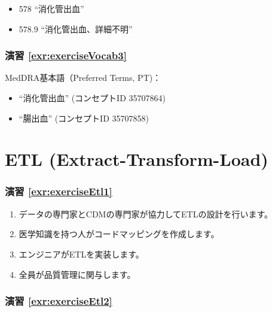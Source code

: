 \documentclass[
  11pt]{book}
\providecommand{\tightlist}{%
  \setlength{\itemsep}{0pt}\setlength{\parskip}{0pt}}
\theoremstyle{definition}
\theoremstyle{definition}
\theoremstyle{definition}
\theoremstyle{definition}
\theoremstyle{remark}
\begin{document}
\begin{itemize}
\tightlist
\item
  578 ``消化管出血''
\item
  578.9 ``消化管出血、詳細不明''
\end{itemize}

\subsubsection*{演習 \ref{exr:exerciseVocab3}}\label{ux6f14ux7fd2-refexrexercisevocab3}

MedDRA基本語（Preferred Terms, PT)：

\begin{itemize}
\tightlist
\item
  ``消化管出血'' (コンセプトID 35707864)
\item
  ``腸出血'' (コンセプトID 35707858)
\end{itemize}

\section{ETL (Extract-Transform-Load)}\label{Etlanswers}

\subsubsection*{演習 \ref{exr:exerciseEtl1}}\label{ux6f14ux7fd2-refexrexerciseetl1}

\begin{enumerate}
\def\labelenumi{\Alph{enumi})}
\tightlist
\item
  データの専門家とCDMの専門家が協力してETLの設計を行います。
\item
  医学知識を持つ人がコードマッピングを作成します。
\item
  エンジニアがETLを実装します。
\item
  全員が品質管理に関与します。
\end{enumerate}

\subsubsection*{演習 \ref{exr:exerciseEtl2}}\label{ux6f14ux7fd2-refexrexerciseetl2}
\end{document}
